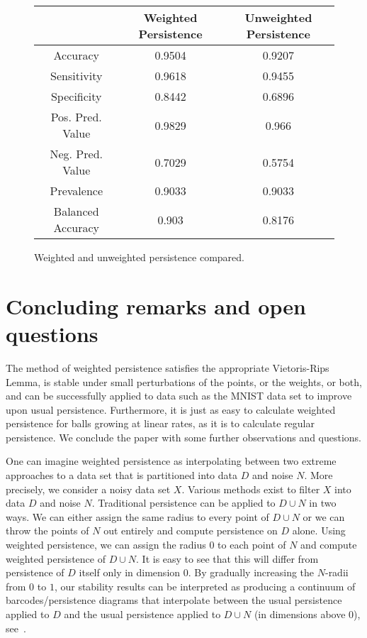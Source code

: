 \documentclass{amsart}
\newtheorem*{fibering lemma}{Fibering Lemma}
\newtheorem*{decomposition lemma}{Decomposition Lemma}
\newtheorem*{hurewicz theorem}{Hurewicz Theorem}
\theoremstyle{definition}
\begin{document}
\begin{figure}[ht]
\begin{center}
\begin{tabular}{|c|c||c|}\hline
& Weighted Persistence & Unweighted Persistence \\ \hline
Accuracy & 0.9504 & 0.9207\\ \hline
Sensitivity & 0.9618 & 0.9455\\ \hline
Specificity & 0.8442 & 0.6896\\ \hline

Pos. Pred. Value & 0.9829 & 0.966\\ \hline

Neg. Pred. Value & 0.7029 & 0.5754\\ \hline

Prevalence & 0.9033 & 0.9033\\ \hline

Balanced Accuracy & 0.903 & 0.8176 \\ \hline

    
\end{tabular}
\caption{Weighted and unweighted persistence compared.}\label{summarytable}
\end{center}
\end{figure}
\section{Concluding remarks and open questions} 
The method of weighted persistence satisfies the appropriate Vietoris-Rips Lemma, is stable under small perturbations of the points, or the weights, or both, and can be successfully applied to data such as the MNIST data set to improve upon usual persistence. Furthermore, it is just as easy to calculate weighted persistence for balls growing at linear rates, as it is to calculate regular persistence. We conclude the paper with some further observations and questions.

One can imagine weighted persistence as interpolating between two extreme approaches to a data set that is partitioned into data $D$ and noise $N$. More precisely, we consider a noisy data set $X$. Various methods exist to filter $X$ into data $D$ and noise $N$. Traditional persistence can be applied to $D\cup N$ in two ways. We can either assign the same radius to every point of $D\cup N$ or we can throw the points of $N$ out entirely and compute persistence on $D$ alone. Using weighted persistence, we can assign the radius $0$ to each point of $N$ and compute weighted persistence of $D\cup N$. It is easy to see that this will differ from persistence of $D$ itself only in dimension $0$. By gradually increasing the $N$-radii from $0$ to $1$, our stability results can be interpreted as producing a continuum of barcodes/persistence diagrams that interpolate between the usual persistence applied to $D$ and the usual persistence applied to $D\cup N$ (in dimensions above $0$), see~\cite{Austin}.
\end{document}
